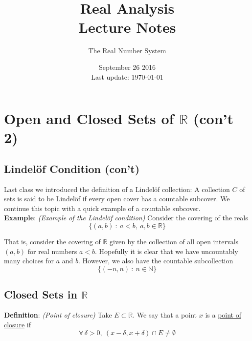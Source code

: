 \documentclass[12pt]{article}
\newlength\tindent
\renewcommand{\indent}{\hspace*{\tindent}}
\newcommand{\R}{\mathbb R}
\newcommand{\N}{\mathbb N}
\begin{document}
 
 
\title{Real Analysis\\Lecture Notes}
\author{The Real Number System}
\date{September 26 2016 \\ Last update: \today{}}
\maketitle

\section{Open and Closed Sets of $\bm{\R}$ (con't 2)}

\subsection{Lindel\"{o}f Condition (con't)} 

\indent Last class we introduced the definition of a Lindel\"{o}f collection: A collection $C$ of sets is said to be \underline{Lindel\"{o}f} if every open cover has a countable subcover. We continue this topic with a quick example of a countable subcover. \\

%
%
{\bf Example}: {\em (Example of the Lindel\"{o}f condition)} Consider the covering of the reals
\begin{equation*}
	\{(a, b)~:~a < b,~ a, b \in \R\}
\end{equation*}

\indent That is, consider the covering of $\R$ given by the collection of all open intervals $(a,b)$ for real numbers $a < b$. Hopefully it is clear that we have uncountably many choices for $a$ and $b$. However, we also have the countable subcollection
\begin{equation*}
	\{(-n, n)~:~n\in\N\}
\end{equation*}

\subsection{Closed Sets in $\bm{\R}$}

%
%
{\bf Definition}: {\em (Point of closure)} Take $E \subset \R$. We say that a point $x$ is a \underline{point of closure} if
\begin{equation*}
	\forall\,\delta > 0,~(x - \delta, x + \delta) \cap E \neq \emptyset
\end{equation*}
\end{document}

